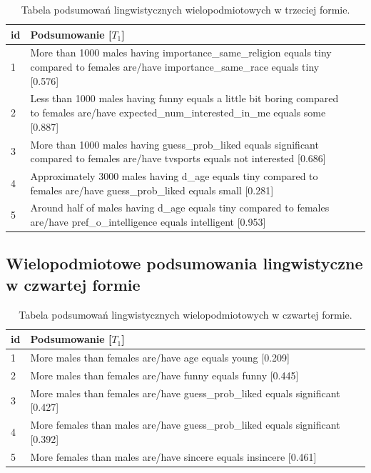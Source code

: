 \documentclass{classrep}
\begin{document}
\begin{center}
  \begin{table}[H]
    \begin{tabularx}{\textwidth}{lXc}
    
    id & Podsumowanie [$T_1$] \\ \hline 
  
    1 & More than 1000 males having importance\_same\_religion equals tiny compared to females are/have importance\_same\_race equals tiny [0.576] \\\hline
    2 & Less than 1000 males having funny equals a little bit boring compared to females are/have expected\_num\_interested\_in\_me equals some [0.887]\\  \hline
    3 & More than 1000 males having guess\_prob\_liked equals significant compared to females are/have tvsports equals not interested [0.686] \\ \hline
    4 & Approximately 3000 males having d\_age equals tiny compared to females are/have guess\_prob\_liked equals small [0.281] \\ \hline
    5 & Around half of males having d\_age equals tiny compared to females are/have pref\_o\_intelligence equals intelligent [0.953]\\ \hline
  \end{tabularx}
  \caption{Tabela podsumowań lingwistycznych wielopodmiotowych w trzeciej formie.}
\end{table}
\end{center}

\subsection{Wielopodmiotowe podsumowania lingwistyczne w czwartej formie}

\begin{center}
  \begin{table}[H]
    \begin{tabularx}{\textwidth}{lXc}
    
    id & Podsumowanie [$T_1$] \\ \hline 
  
    1 & More males than females are/have age equals young [0.209] \\\hline
    2 & More males than females are/have funny equals funny [0.445] \\  \hline
    3 & More males than females are/have guess\_prob\_liked equals significant [0.427]\\ \hline
    4 & More females than males are/have guess\_prob\_liked equals significant [0.392]\\ \hline
    5 & More females than males are/have sincere equals insincere [0.461]\\ \hline
  \end{tabularx}
  \caption{Tabela podsumowań lingwistycznych wielopodmiotowych w czwartej formie.}
\end{table}
\end{center}
\end{document}
